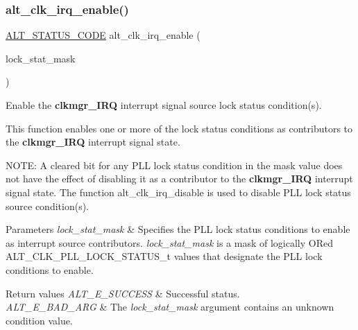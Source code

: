 \subsubsection{\texorpdfstring{alt\_clk\_irq\_enable()}{alt\_clk\_irq\_enable()}}
{\footnotesize\ttfamily \mbox{\hyperlink{hwlib_8h_abdb0d369f069723ca55d6c94bcaaaa12}{A\+L\+T\+\_\+\+S\+T\+A\+T\+U\+S\+\_\+\+C\+O\+DE}} alt\+\_\+clk\+\_\+irq\+\_\+enable (\begin{DoxyParamCaption}\item[{\mbox{\hyperlink{group__CLK__MGR__STATUS_ga62fbfc277685cad341f57ee0a252092c}{A\+L\+T\+\_\+\+C\+L\+K\+\_\+\+P\+L\+L\+\_\+\+L\+O\+C\+K\+\_\+\+S\+T\+A\+T\+U\+S\+\_\+t}}}]{lock\+\_\+stat\+\_\+mask }\end{DoxyParamCaption})}

Enable the {\bfseries{clkmgr\+\_\+\+I\+RQ}} interrupt signal source lock status condition(s).

This function enables one or more of the lock status conditions as contributors to the {\bfseries{clkmgr\+\_\+\+I\+RQ}} interrupt signal state.

N\+O\+TE\+: A cleared bit for any P\+LL lock status condition in the mask value does not have the effect of disabling it as a contributor to the {\bfseries{clkmgr\+\_\+\+I\+RQ}} interrupt signal state. The function alt\+\_\+clk\+\_\+irq\+\_\+disable is used to disable P\+LL lock status source condition(s).


\begin{DoxyParams}{Parameters}
{\em lock\+\_\+stat\+\_\+mask} & Specifies the P\+LL lock status conditions to enable as interrupt source contributors. {\itshape lock\+\_\+stat\+\_\+mask} is a mask of logically OR\textquotesingle{}ed A\+L\+T\+\_\+\+C\+L\+K\+\_\+\+P\+L\+L\+\_\+\+L\+O\+C\+K\+\_\+\+S\+T\+A\+T\+U\+S\+\_\+t values that designate the P\+LL lock conditions to enable.\\
\hline
\end{DoxyParams}

\begin{DoxyRetVals}{Return values}
{\em A\+L\+T\+\_\+\+E\+\_\+\+S\+U\+C\+C\+E\+SS} & Successful status. \\
\hline
{\em A\+L\+T\+\_\+\+E\+\_\+\+B\+A\+D\+\_\+\+A\+RG} & The {\itshape lock\+\_\+stat\+\_\+mask} argument contains an unknown condition value. \\
\hline
\end{DoxyRetVals}
